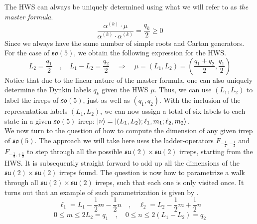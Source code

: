 The HWS can always be uniquely determined using what we will refer to as \textit{the master formula}.
%
%
\begin{equation}\label{master formula}
\frac{\alpha^{(k)} \cdot \mu}{\alpha^{(k)} \cdot \alpha^{(k)}}
=
\frac{q_k}{2} \geq 0
\end{equation}
%
%
Since we always have the same number of simple roots and Cartan generators. For the case of $\mathfrak{so}(5)$, we obtain the following expression for the HWS.
%
%
\begin{equation}
L_2 = \frac{q_1}{2}
%
\quad , \quad
%
L_1 - L_2 = \frac{q_2}{2}
%
\quad \Rightarrow \quad
%
\mu = (L_1, L_2) = \left(\frac{q_1 + q_2}{2}, \frac{q_1}{2} \right)
\end{equation}
%
%
Notice that due to the linear nature of the master formula, one can also uniquely determine the Dynkin labels $q_k$ given the HWS $\mu$. Thus, we can use $(L_1, L_2)$ to label the irreps of $\mathfrak{so}(5)$, just as well as $(q_1, q_2)$. With the inclusion of the representation labels $(L_1, L_2)$, we can now assign a total of six labels to each state in a given $\mathfrak{so}(5)$ irrep: $\ket{\nu} = \ket{(L_1,L_2);\ell_1,m_1;\ell_2,m_2}$.\\
We now turn to the question of how to compute the dimension of any given irrep of $\mathfrak{so}(5)$. The approach we will take here uses the ladder-operators $F_{-\frac{1}{2},-\frac{1}{2}}$ and $F_{-\frac{1}{2},+\frac{1}{2}}$ to step through all the possible $\mathfrak{su}(2) \times \mathfrak{su}(2)$ irreps, starting from the HWS. It is subsequently straight forward to add up all the dimensions of the $\mathfrak{su}(2) \times \mathfrak{su}(2)$ irreps found. The question is now how to parametrize a walk through all $\mathfrak{su}(2) \times \mathfrak{su}(2)$ irreps, such that each one is only visited once. It turns out that an example of such parametrization is given by \cite{SO(5) and SO(6) rep theory}.
%
%
\begin{equation}\label{possible l1 l2}
\ell_1 = L_1 - \frac{1}{2} m - \frac{1}{2} n
%
\quad , \quad
%
\ell_2 = L_2 - \frac{1}{2} m + \frac{1}{2} n
\end{equation}
%
%
\begin{equation}\label{m and n ranges}
0 \leq m \leq 2 L_2 = q_1
%
\quad , \quad
%
0 \leq n \leq 2 (L_1 - L_2) = q_2
\end{equation}
%
%
%
